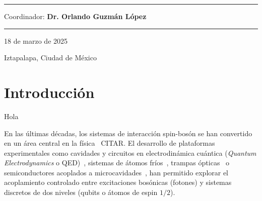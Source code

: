 \documentclass[onecolumn,notitlepage,letterpaper,aps,pra,12pt]{article}
\numberwithin{equation}{section}
\begin{document}
\begin{titlepage}
\vspace{1cm}
\rule{5cm}{0.3mm}

\vspace{0.45cm}
{\large Coordinador: \textbf{Dr. Orlando Guzmán López}  \par}

{\LARGE \rule{15cm}{1.0mm}  \par}

\vspace{0.4cm}

{\large 18 de marzo de 2025 \par}
\vspace{0.1cm}
{\large Iztapalapa, Ciudad de México \par}
\end{titlepage}

\clearpage
\tableofcontents
\clearpage
\newpage



\section{Introducción}

Hola 

En las últimas décadas, los sistemas de interacción spin-bosón se han convertido en un área central en la física~\cite{haroche2006} CITAR. El desarrollo de plataformas experimentales como cavidades y circuitos en electrodinámica cuántica (\textit{Quantum Electrodynamics} o QED)~\cite{Blais2021,Clerk2020}, sistemas de átomos fríos~\cite{Mekhov2012}, trampas ópticas~\cite{Yuanjie2021} o semiconductores acoplados a microcavidades~\cite{Schneider2018}, han permitido explorar el acoplamiento controlado entre excitaciones bosónicas (fotones) y sistemas discretos de dos niveles (qubits o átomos de espin $1/2$). %
\end{document}
